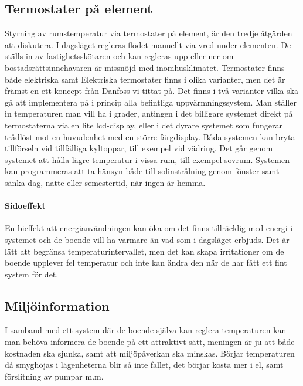 \subsection{Termostater på element}
Styrning av rumstemperatur via termostater på element, är den tredje åtgärden att diskutera. I dagsläget regleras flödet manuellt via vred under elementen. De ställs in av fastighetsskötaren och kan regleras upp eller ner om bostadsrättsinnehavaren är missnöjd med inomhusklimatet. Termostater finns både elektriska samt 
Elektriska termostater finns i olika varianter, men det är främst en ett koncept från Danfoss vi tittat på. Det finns i två varianter vilka ska gå att implementera på i princip alla befintliga uppvärmningssystem. Man ställer in temperaturen man vill ha i grader, antingen i det billigare systemet direkt på termostaterna via en lite lcd-display, eller i det dyrare systemet som fungerar trådlöst mot en huvudenhet med en större färgdisplay.
Båda systemen kan bryta tillförseln vid tillfälliga kyltoppar, till exempel vid vädring. Det går genom systemet att hålla lägre temperatur i vissa rum, till exempel sovrum. Systemen kan programmeras att ta hänsyn både till solinstrålning genom fönster samt sänka dag, natte eller semestertid, när ingen är hemma.

\paragraph{Sidoeffekt}
En bieffekt att energianvändningen kan öka om det finns tillräcklig med energi i systemet och de boende vill ha varmare än vad som i dagsläget erbjuds. Det är lätt att begränsa temperaturintervallet, men det kan skapa irritationer om de boende upplever fel temperatur och inte kan ändra den när de har fått ett fint system för det.

\subsection{Miljöinformation}
I samband med ett system där de boende själva kan reglera temperaturen kan man behöva informera de boende på ett attraktivt sätt, meningen är ju att både kostnaden ska sjunka, samt att miljöpåverkan ska minskas. Börjar temperaturen då smyghöjas i lägenheterna blir så inte fallet, det börjar kosta mer i el, samt förslitning av pumpar m.m.  \cite{viivilla}


